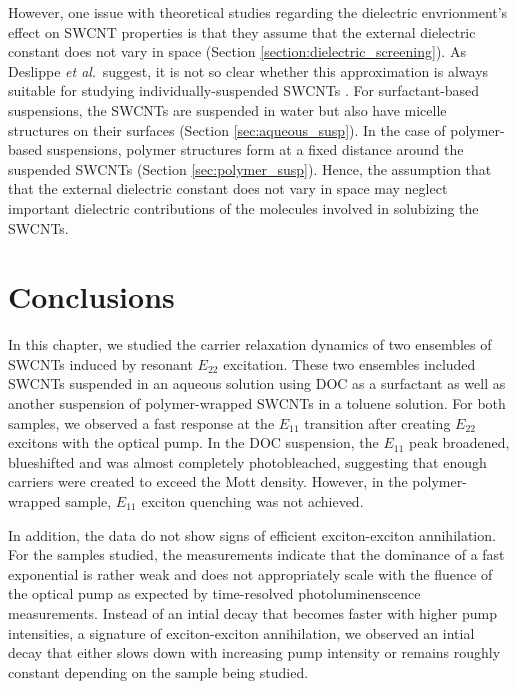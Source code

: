 However, one issue with theoretical studies regarding the dielectric envrionment's effect on SWCNT properties is that they assume that the external dielectric constant does not vary in space \cite{perebeinos2004scaling, walsh2007screening, ando2011effects} (Section \ref{section:dielectric_screening}). As Deslippe \textit{et al}.\ suggest, it is not so clear whether this approximation is always suitable for studying individually-suspended SWCNTs \cite{deslippe2009electron}. For surfactant-based suspensions, the SWCNTs are suspended in water but also have micelle structures on their surfaces (Section \ref{sec:aqueous_susp}). In the case of polymer-based suspensions, polymer structures form at a fixed distance around the suspended SWCNTs (Section \ref{sec:polymer_susp}). Hence, the assumption that that the external dielectric constant does not vary in space may neglect important dielectric contributions of the molecules involved in solubizing the SWCNTs.

\section{Conclusions}

In this chapter, we studied the carrier relaxation dynamics of two ensembles of SWCNTs induced by resonant $E_{22}$ excitation. These two ensembles included SWCNTs suspended in an aqueous solution using DOC as a surfactant as well as another suspension of polymer-wrapped SWCNTs in a toluene solution. For both samples, we observed a fast response at the $E_{11}$ transition after creating $E_{22}$ excitons with the optical pump. In the DOC suspension, the $E_{11}$ peak broadened, blueshifted and was almost completely photobleached, suggesting that enough carriers were created to exceed the Mott density. However, in the polymer-wrapped sample, $E_{11}$ exciton quenching was not achieved.

In addition, the data do not show signs of efficient exciton-exciton annihilation. For the samples studied, the measurements indicate that the dominance of a fast exponential is rather weak and does not appropriately scale with the fluence of the optical pump as expected by time-resolved photoluminenscence measurements. Instead of an intial decay that becomes faster with higher pump intensities, a signature of exciton-exciton annihilation, we observed an intial decay that either slows down with increasing pump intensity or remains roughly constant depending on the sample being studied.

